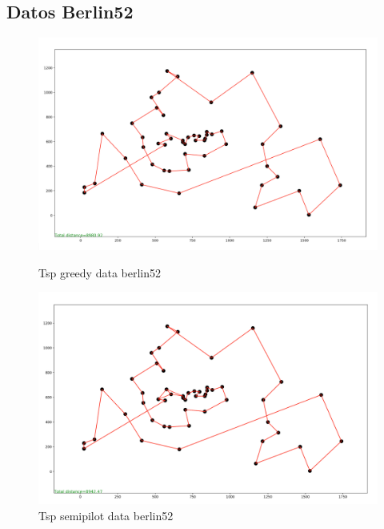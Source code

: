 \documentclass{article}
\begin{document}
\subsection{Datos Berlin52}

\begin{figure}[H]
\begin{minipage}{0.5\textwidth}
\centering
\includegraphics[width=1\textwidth]{../../image/greedy/greedy-berlin52.png}
\caption{\label{fig:Figura1} Tsp greedy data berlin52}
\end{minipage}\hfill
\begin {minipage}{0.5\textwidth}
\centering
\includegraphics[width=1\textwidth]{../../image/semipilot/semipilot-berlin52-2-2.png}
\caption{\label{fig:Figura1} Tsp semipilot data berlin52}
\end{minipage}
\end{figure}
\end{document}
